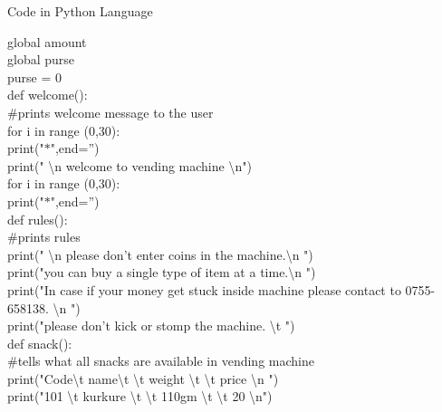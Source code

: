 \documentclass[10pt,a4paper]{article}
\begin{document}
\begin{flushleft}
\begin{center}
\end{center}
\newpage
\begin{center}
Code in Python Language\\
\bigskip
\end{center}
global amount\\
global purse\\
purse = 0\\
def welcome():\\\#prints welcome message to the user\\
\hspace*{0.5cm}    for i in range (0,30):\\
\hspace*{0.5cm}\hspace*{0.5cm}        print("$\ast$",end='')\\
\hspace*{0.5cm}    print(" \textbackslash n welcome to vending machine \textbackslash n")\\
\hspace*{0.5cm}    for i in range (0,30):\\
\hspace*{0.5cm}\hspace*{0.5cm}        print("$\ast$",end='')\\
\bigskip
def rules():\\ \#prints rules \\
\hspace*{0.5cm}    print(" \textbackslash n please don't enter coins in the machine.\textbackslash n ")\\
\hspace*{0.5cm}    print("you can buy a single type of item at a time.\textbackslash n ")\\
\hspace*{0.5cm}    print("In case if your money get stuck inside machine please contact to 0755-658138. \textbackslash n ")\\
\hspace*{0.5cm}    print("please don't kick or stomp the machine. \textbackslash t ")\\
\bigskip
def snack():\\  \#tells what all snacks are available in vending machine\\
\hspace*{0.5cm}    print("Code\textbackslash t name\textbackslash t \textbackslash t weight \textbackslash t \textbackslash t price \textbackslash n ")\\
\hspace*{0.5cm}    print("101 \textbackslash t kurkure \textbackslash t \textbackslash t 110gm \textbackslash t \textbackslash t 20 \textbackslash n")\\

\end{flushleft}
\end{document}
